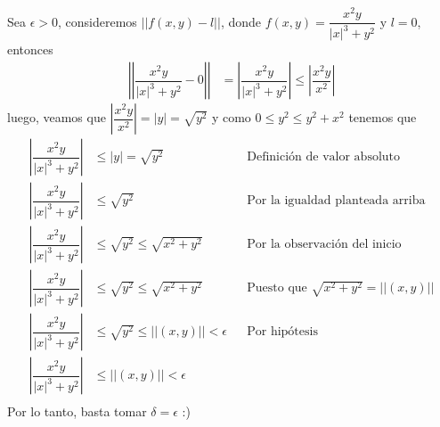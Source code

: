 \documentclass[letterpaper]{article}
\providecommand{\abs}[1]{\left|#1\right|}
\providecommand{\norm}[1]{\left|\left|#1\right|\right|}
\renewcommand{\*}{\cdot}
\theoremstyle{definition}
\begin{document}
Sea $ \epsilon > 0 $, consideremos $ \norm{f(x,y) - l} $, donde $ f(x,y) = \dfrac{x^2y}{\vert x \vert^3 + y^2} $ y $ l = 0 $, entonces
\begin{align*}
	\norm{\dfrac{x^2y}{\vert x \vert^3 + y^2} - 0} &= \abs{\dfrac{x^2y}{\vert x \vert^3 + y^2}} \leq \abs{\dfrac{x^2y}{x^2}}
\end{align*}
luego, veamos que $ \abs{\dfrac{x^2y}{x^2}} = \abs{y} = \sqrt{y^2} $ y como $ 0 \leq y^2 \leq y^2 + x^2 $ tenemos que
\begin{align*}
	\abs{\dfrac{x^2y}{\abs{x}^3 + y^2}} &\leq \abs{y} = \sqrt{y^2} && \text{Definición de valor absoluto}\\
	\abs{\dfrac{x^2y}{\abs{x}^3 + y^2}} &\leq \sqrt{y^2} && \text{Por la igualdad planteada arriba}\\
	\abs{\dfrac{x^2y}{\abs{x}^3 + y^2}} &\leq \sqrt{y^2} \leq \sqrt{x^2 + y^2}&& \text{Por la observación del inicio}\\
	\abs{\dfrac{x^2y}{\abs{x}^3 + y^2}} &\leq \sqrt{y^2} \leq \sqrt{x^2 + y^2} && \text{Puesto que }\sqrt{x^2 + y^2} = \norm{(x,y)} \\
	\abs{\dfrac{x^2y}{\abs{x}^3 + y^2}} &\leq \sqrt{y^2} \leq \norm{(x,y)} < \epsilon && \text{Por hipótesis} \\
	\abs{\dfrac{x^2y}{\abs{x}^3 + y^2}} &\leq \norm{(x,y)} < \epsilon \\
\end{align*}
Por lo tanto, basta tomar $ \delta = \epsilon $ :)
\end{document}
